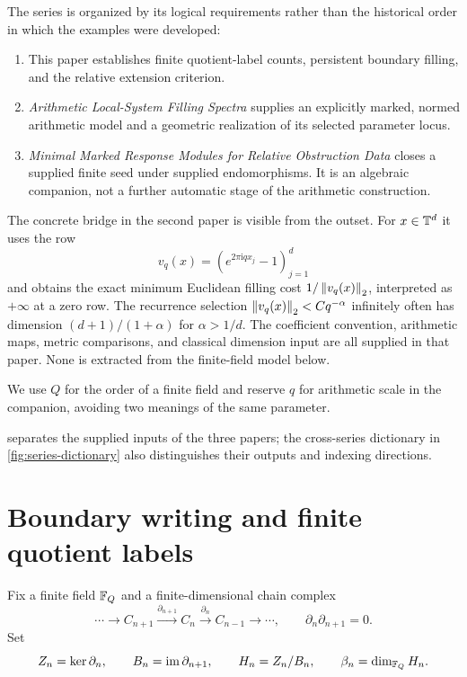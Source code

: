 \documentclass[11pt,a4paper]{article}
\begin{document}
The series is organized by its logical requirements rather than the
historical order in which the examples were developed:
\begin{enumerate}
 \item This paper establishes finite quotient-label counts, persistent
 boundary filling, and the relative extension criterion.
 \item \emph{Arithmetic Local-System Filling Spectra} supplies an
 explicitly marked, normed arithmetic model and a geometric realization
 of its selected parameter locus.
 \item \emph{Minimal Marked Response Modules for Relative Obstruction
 Data} closes a supplied finite seed under supplied endomorphisms.  It is
 an algebraic companion, not a further automatic stage of the arithmetic
 construction.
\end{enumerate}

The concrete bridge in the second paper is visible from the outset.  For
$x\in\mathbb T^d$ it uses the row
\[
 v_q(x)=(e^{2\pi\mathrm i qx_j}-1)_{j=1}^d
\]
and obtains the exact minimum Euclidean filling cost
$1/\left\lVert v_q(x)\right\rVert_2$, interpreted as $+\infty$ at a zero row.  The
recurrence selection $\left\lVert v_q(x)\right\rVert_2<Cq^{-\alpha}$ infinitely often
has dimension $(d+1)/(1+\alpha)$ for $\alpha>1/d$.  The coefficient
convention, arithmetic maps, metric comparisons, and classical dimension
input are all supplied in that paper.  None is extracted from the
finite-field model below.

We use $Q$ for the order of a finite field and reserve $q$ for arithmetic
scale in the companion, avoiding two meanings of the same parameter.

 separates the supplied inputs of the three
papers; the cross-series dictionary in \cref{fig:series-dictionary}
also distinguishes their outputs and indexing directions.


\section{Boundary writing and finite quotient labels}
\label{sec:labels}

Fix a finite field $\mathbb F_Q$ and a finite-dimensional chain complex
\[
 \cdots\longrightarrow C_{n+1}\xrightarrow{\partial_{n+1}}C_n
           \xrightarrow{\partial_n}C_{n-1}\longrightarrow\cdots,
 \qquad\partial_n\partial_{n+1}=0.
\]
Set
\[
 Z_n=\ker\partial_n,\qquad B_n=\operatorname{im}\partial_{n+1},\qquad
 H_n=Z_n/B_n,\qquad\beta_n=\dim_{\mathbb F_Q}H_n.
\]
\end{document}
